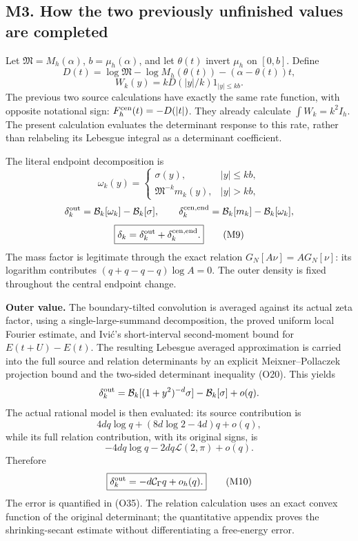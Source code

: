 \documentclass[11pt,a4paper]{article}
\begin{document}
\subsection{M3. How the two previously unfinished values are
completed}\label{sa:m3.-how-the-two-previously-unfinished-values-are-completed}

Let \(\mathfrak M=M_h(\alpha)\), \(b=\mu_h(\alpha)\), and let
\(\theta(t)\) invert \(\mu_h\) on \([0,b]\). Define \[
D(t)=\log\mathfrak M-\log M_h(\theta(t))-(\alpha-\theta(t))t,
\] \[
W_k(y)=kD(|y|/k)1_{|y|\le kb}.
\] The previous two source calculations have exactly the same rate
function, with opposite notational sign: \(F_h^{\rm cen}(t)=-D(|t|)\).
They already calculate \(\int W_k=k^2I_h\). The present calculation
evaluates the determinant response to this rate, rather than relabeling
its Lebesgue integral as a determinant coefficient.

The literal endpoint decomposition is \[
\omega_k(y)=
\begin{cases}\sigma(y),&|y|\le kb,\\
\mathfrak M^{-k}m_k(y),&|y|>kb,
\end{cases}
\] \[
\delta_k^{\rm out}=\mathcal B_k[\omega_k]-\mathcal B_k[\sigma],\qquad
\delta_k^{\rm cen,end}=\mathcal B_k[m_k]-\mathcal B_k[\omega_k],
\] \[
\boxed{\delta_k=\delta_k^{\rm out}+\delta_k^{\rm cen,end}.}\tag{M9}
\] The mass factor is legitimate through the exact relation
\(G_N[A\nu]=AG_N[\nu]\): its logarithm contributes
\((q+q-q-q)\log A=0\). The outer density is fixed throughout the central
endpoint change.

\textbf{Outer value.} The boundary-tilted convolution is averaged
against its actual zeta factor, using a single-large-summand
decomposition, the proved uniform local Fourier estimate, and Ivić's
short-interval second-moment bound for \(E(t+U)-E(t)\). The resulting
Lebesgue averaged approximation is carried into the full source and
relation determinants by an explicit Meixner--Pollaczek projection bound
and the two-sided determinant inequality (O20). This yields \[
\delta_k^{\rm out}
=\mathcal B_k[(1+y^2)^{-d}\sigma]-\mathcal B_k[\sigma]+o(q).
\] The actual rational model is then evaluated: its source contribution
is \[
4dq\log q+(8d\log2-4d)q+o(q),
\] while its full relation contribution, with its original signs, is \[
-4dq\log q-2dq\mathcal L(2,\pi)+o(q).
\] Therefore \[
\boxed{\delta_k^{\rm out}=-d\mathcal C_\Gamma q+o_h(q).}\tag{M10}
\] The error is quantified in (O35). The relation calculation uses an
exact convex function of the original determinant; the quantitative
appendix proves the shrinking-secant estimate without differentiating a
free-energy error.
\end{document}
